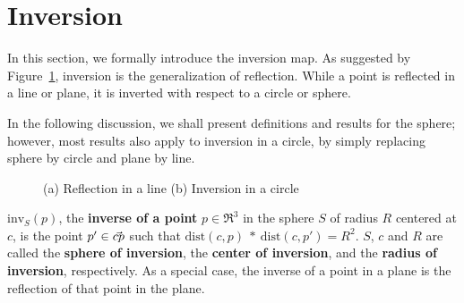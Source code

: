 

% 

\section{Inversion}
\label{sec:inv}

In this section, we formally introduce the inversion map.
As suggested by Figure~\ref{fig1},
inversion is the generalization of reflection.
While a point is reflected in a line or plane, it is inverted with respect
to a circle or sphere.

In the following discussion, we shall present definitions and results
for the sphere; however, most results also apply to inversion in a 
circle, by simply replacing sphere by circle and plane by line.

\begin{figure}
\vspace{2.5in}
\caption{(a) Reflection in a line (b) Inversion in a circle}
\label{fig1}
\end{figure}

\begin{defn2}
$\mbox{inv}_{S}(p)$, the {\bf inverse of a point} $p \in \Re^{3}$ in the 
sphere $S$ of radius $R$ centered at $c$, 
is the point $p' \in \mbox{$\vec{cp}$}$ such that
$\mbox{dist}(c,p)\ *\ \mbox{dist}(c,p') = R^{2}$.
$S$, $c$ and $R$ are called the {\bf sphere of inversion},
the {\bf center of inversion},
and the {\bf radius of inversion}, respectively.
As a special case, the inverse of a point in a plane is the reflection
of that point in the plane.
%
\end{defn2}

